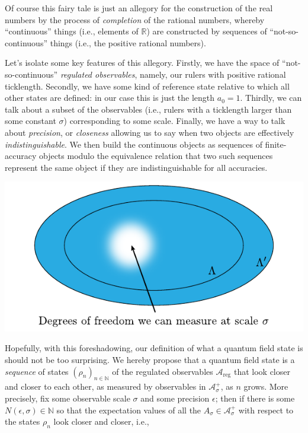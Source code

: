 \documentclass[11pt]{amsart}
\theoremstyle{plain}%
\theoremstyle{definition}
\theoremstyle{remark}
\begin{document}
Of course this fairy tale is just an allegory for the construction of the real numbers by the process of \emph{completion} of the rational numbers, whereby ``continuous'' things (i.e., elements of $\mathbb{R}$) are constructed by sequences of ``not-so-continuous'' things (i.e., the positive rational numbers).

Let's isolate some key features of this allegory. Firstly, we have the space of ``not-so-continuous'' \emph{regulated observables}, namely, our rulers with positive rational ticklength. Secondly, we have some kind of reference state relative to which all other states are defined: in our case this is just the length $a_0 = 1$. Thirdly, we can talk about a subset of the observables (i.e., rulers with a ticklength larger than some constant $\sigma$) corresponding to some scale. Finally, we have a way to talk about \emph{precision}, or \emph{closeness} allowing us to say when two objects are effectively \emph{indistinguishable}.  We then build the continuous objects as sequences of finite-accuracy objects modulo the equivalence relation that two such sequences represent the same object if they are indistinguishable for all accuracies.
\begin{center}
	\includegraphics{renormalisability.pdf}
\end{center}
Hopefully, with this foreshadowing, our definition of what a quantum field state is should not be too surprising. We hereby propose that a quantum field state is a \emph{sequence} of states $(\rho_n)_{n\in\mathbb{N}}$ of the regulated observables $\mathcal{A}_{\text{reg}}$ that look closer and closer to each other, as measured by observables in $\mathcal{A}_\sigma^+$, as $n$ grows. More precisely, fix some observable scale $\sigma$ and some precision $\epsilon$; then if there is some $N(\epsilon, \sigma) \in \mathbb{N}$ so that the expectation values of all the $A_\sigma\in \mathcal{A}_\sigma^+$ with respect to the states $\rho_n$ look closer and closer, i.e.,
\end{document}
